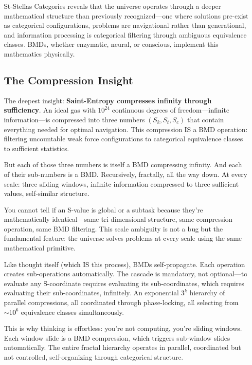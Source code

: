 \documentclass[12pt,a4paper]{article}
\begin{document}
St-Stellas Categories reveals that the universe operates through a deeper mathematical structure than previously recognized—one where solutions pre-exist as categorical configurations, problems are navigational rather than generational, and information processing is categorical filtering through ambiguous equivalence classes. BMDs, whether enzymatic, neural, or conscious, implement this mathematics physically.

\subsection{The Compression Insight}

The deepest insight: \textbf{Saint-Entropy compresses infinity through sufficiency}. An ideal gas with $10^{24}$ continuous degrees of freedom—infinite information—is compressed into three numbers $(S_k, S_t, S_e)$ that contain everything needed for optimal navigation. This compression IS a BMD operation: filtering uncountable weak force configurations to categorical equivalence classes to sufficient statistics.

But each of those three numbers is itself a BMD compressing infinity. And each of their sub-numbers is a BMD. Recursively, fractally, all the way down. At every scale: three sliding windows, infinite information compressed to three sufficient values, self-similar structure.

You cannot tell if an S-value is global or a subtask because they're mathematically identical—same tri-dimensional structure, same compression operation, same BMD filtering. This scale ambiguity is not a bug but the fundamental feature: the universe solves problems at every scale using the same mathematical primitive.

Like thought itself (which IS this process), BMDs self-propagate. Each operation creates sub-operations automatically. The cascade is mandatory, not optional—to evaluate any S-coordinate requires evaluating its sub-coordinates, which requires evaluating their sub-coordinates, infinitely. An exponential $3^k$ hierarchy of parallel compressions, all coordinated through phase-locking, all selecting from $\sim 10^6$ equivalence classes simultaneously.

This is why thinking is effortless: you're not computing, you're sliding windows. Each window slide is a BMD compression, which triggers sub-window slides automatically. The entire fractal hierarchy operates in parallel, coordinated but not controlled, self-organizing through categorical structure.
\end{document}
